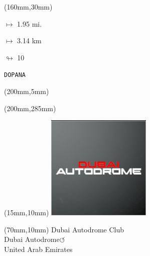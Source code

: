 \begin{textblock*}{40mm}(160mm,30mm)%
\Large
\par$\mapsto$ 1.95 mi.
\par$\mapsto$ 3.14 km
\par$\looparrowright$ 10
\par\hfill\tiny\tt DOPANA\\
\end{textblock*}
\begin{textblock*}{20mm}(200mm,5mm)%
\fbox{\thepage}
\label{DOPANA}
\end{textblock*}
\begin{textblock*}{20mm}(200mm,285mm)%
\fbox{\thepage}
\end{textblock*}

\null\newpage
\begin{textblock*}{50mm}(15mm,10mm)%
\includegraphics[width=50mm]{LG/2015-05-20_00081.png}
\end{textblock*}
\begin{textblock*}{130mm}(70mm,10mm)%
{\fontsize{20}{20}\selectfont Dubai Autodrome Club\\}
{\fontsize{16}{16}\selectfont Dubai Autodrome\hfill \huge$\circlearrowleft$\\}
{\fontsize{12}{12}\selectfont United Arab Emirates\\}
\end{textblock*}

